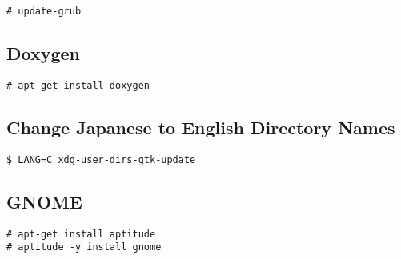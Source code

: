 \noindent
\begin{Sbox}
\begin{minipage}[t]{0.975\linewidth}
\begin{verbatim}
# update-grub
\end{verbatim}
\end{minipage}
\end{Sbox}
\fbox{\TheSbox}


\subsection{Doxygen}

\noindent
\begin{Sbox}
\begin{minipage}[t]{0.975\linewidth}
\begin{verbatim}
# apt-get install doxygen
\end{verbatim}
\end{minipage}
\end{Sbox}
\fbox{\TheSbox}



\subsection{Change Japanese to English Directory Names}

\noindent
\begin{Sbox}
\begin{minipage}[t]{0.975\linewidth}
\begin{verbatim}
$ LANG=C xdg-user-dirs-gtk-update
\end{verbatim}
\end{minipage}
\end{Sbox}
\fbox{\TheSbox}


\subsection{GNOME}

\noindent
\begin{Sbox}
\begin{minipage}[t]{0.975\linewidth}
\begin{verbatim}
# apt-get install aptitude
# aptitude -y install gnome 
\end{verbatim}
\end{minipage}
\end{Sbox}
\fbox{\TheSbox}


